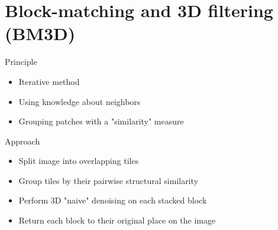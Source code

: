 \section{Block-matching and 3D filtering (BM3D)}
\frame{\sectionpage}

\begin{frame}{Principle}

\begin{itemize}
    \item Iterative method
    \item Using knowledge about neighbors
    \item Grouping patches with a "similarity" measure
\end{itemize}

\end{frame}

\begin{frame}{Approach}
\begin{itemize}
    \item Split image into overlapping tiles
    \item Group tiles by their pairwise structural similarity
    \item Perform 3D "naive" denoising on each stacked block
    \item Return each block to their original place on the image
\end{itemize}
\end{frame}



